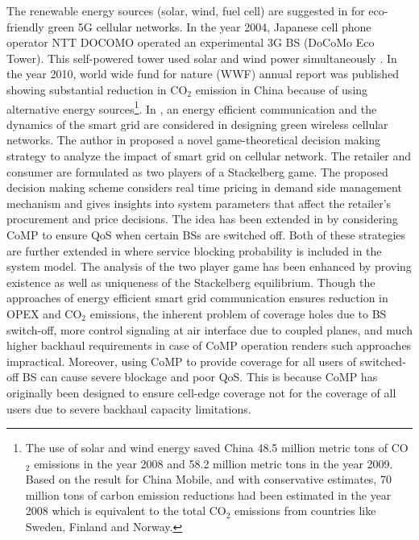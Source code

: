 \documentclass[article,10pt,twocolumn]{IEEEtran}
\begin{document}
The renewable energy sources (solar, wind, fuel cell) are suggested in \citep{6290252} for eco-friendly green 5G cellular networks. In the year 2004, Japanese cell phone operator NTT DOCOMO operated an experimental 3G BS (DoCoMo Eco Tower). This self-powered tower used solar and wind power simultaneously \citep{NTT2004}. In the year 2010, world wide fund for nature (WWF) annual report \citep{WWF2010} was published showing substantial reduction in CO$_2$ emission in China because of using alternative energy sources\footnote{The use of solar and wind energy saved China 48.5 million metric tons of CO$_2$ emissions in the year 2008 and 58.2 million metric tons in the year 2009. Based on the result for China Mobile, and with conservative estimates, 70 million tons of carbon emission reductions had been estimated in the year 2008 which is equivalent to the total CO$_2$ emissions from countries like Sweden, Finland and Norway.}.
In \citep{6102353, 6364971, 6210335}, an energy efficient communication and the dynamics of the smart grid are considered in designing green wireless cellular networks. The author in \citep{6102353} proposed a novel game-theoretical decision making strategy to analyze the impact of smart grid on cellular network. The retailer and consumer are formulated as two players of a Stackelberg game. The proposed decision making scheme considers real time pricing in demand side management mechanism and gives insights into system parameters that affect the retailer's procurement and price decisions. The idea has been extended in \citep{6364971} by considering CoMP to ensure QoS when certain BSs are switched off. Both of these strategies are further extended in \citep{6210335} where service blocking probability is included in the system model. The analysis of the two player game has been enhanced by proving existence as well as uniqueness of the Stackelberg equilibrium. Though the approaches of energy efficient smart grid communication ensures reduction in OPEX and CO$_2$ emissions, the inherent problem of coverage holes due to BS switch-off, more control signaling at air interface due to coupled planes, and much higher backhaul requirements in case of CoMP operation renders such approaches impractical. Moreover, using CoMP to provide coverage for all users of switched-off BS can cause severe blockage and poor QoS. This is because CoMP has originally been designed to ensure cell-edge coverage not for the coverage of all users due to severe backhaul capacity limitations.
\end{document}
